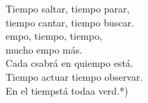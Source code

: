 \begin{cancion}
\begin{chorus}
	Tiempo  saltar, tiempo  parar,\\
	tiempo cantar, tiempo  buscar.\\
	empo, tiempo, tiempo,\\
	mucho empo más.\\
	Cada csabrá en quiempo está.\\
	Tiempo  actuar tiempo  observar.\\
	En el tiempstá todaa verd.*)\\
	\end{chorus}%
\end{cancion}%
